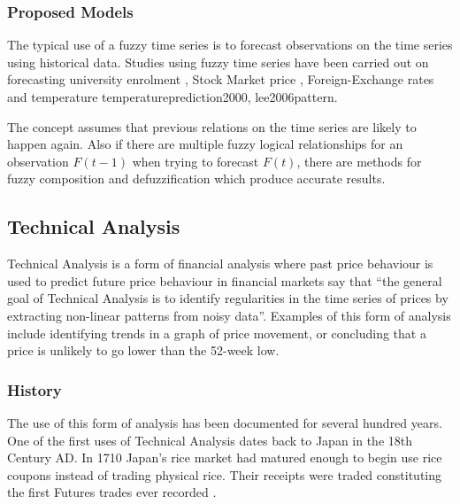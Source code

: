 \documentclass{article}
\theoremstyle{definition}
\begin{document}
\subsubsection{Proposed Models}

The typical use of a fuzzy time series is to forecast observations on the time series using historical data. Studies using fuzzy time series have been carried out on forecasting university enrolment \citep{song1993forecasting, song1994forecasting, chen1996forecasting, cheng2006trend, tsaur2012fuzzy, lee2006pattern, chen2002forecasting, chen2004new, huarng2006ratio}, Stock Market price \citep{chu2009fuzzy, cheng2006trend, lee2006pattern, Chen2007fib, huarng2005type, huarng2006ratio}, Foreign-Exchange rates \citep{tsaur2012fuzzy} and temperature {temperatureprediction2000, lee2006pattern}.

The concept assumes that previous relations on the time series are likely to happen again. Also if there are multiple fuzzy logical relationships for an observation $F(t-1)$ when trying to forecast $F(t)$, there are methods for fuzzy composition and defuzzification which produce accurate results.

\subsection{Technical Analysis}

Technical Analysis is a form of financial analysis where past price behaviour is used to predict future price behaviour in financial markets \cite{foundations} say that ``the general goal of Technical Analysis is to identify regularities in the time series of prices by extracting non-linear patterns from noisy data''. Examples of this form of analysis include identifying trends in a graph of price movement, or concluding that a price is unlikely to go lower than the 52-week low.

\subsubsection{History}

The use of this form of analysis has been documented for several hundred years. One of the first uses of Technical Analysis dates back to Japan in the 18th Century AD. In 1710 Japan's rice market had matured enough to begin use rice coupons instead of trading physical rice. Their receipts were traded constituting the first Futures trades ever recorded \citep[p.15]{jcct1991}. 
\end{document}
